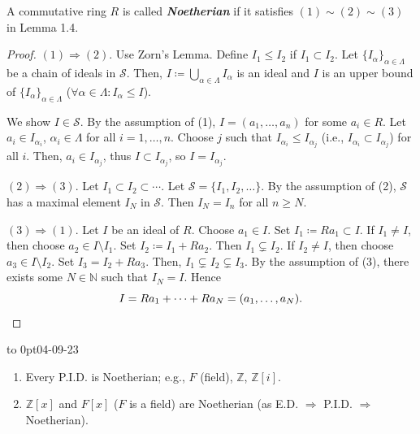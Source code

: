 \documentclass[twoside]{article}
\newcommand\N{\mathbb N}
\newcommand\Z{\mathbb Z}
\theoremstyle{remark}
\newcommand*\term[1]{\textbf{\textit{\mathversion{bold}#1}}}
\newcommand*\newclass[1]{\par\vbox to 0pt{\hbox{\tiny\sffamily\color{gray}#1}} \par\ignorespaces}
\begin{document}
\begin{definition}%
  A commutative ring \(R\) is called \term{Noetherian} if it satisfies \((1) \sim (2) \sim (3)\) in Lemma 1.4.
\end{definition}

\begin{proof}
  \((1) \Rightarrow (2)\). Use Zorn's Lemma. Define \(I_1 \leq I_2\) if \(I_1 \subset I_2\). Let \(\{I_\alpha\}_{\alpha \in \Lambda}\) be a chain of ideals in \(\mathcal S\). Then, \(I \coloneq \bigcup_{\alpha \in \Lambda} I_\alpha\) is an ideal and \(I\) is an upper bound of \(\{I_\alpha\}_{\alpha \in \Lambda}\) (\(\forall \alpha \in \Lambda \colon I_\alpha \leq I\)). \par
  We show \(I \in \mathcal S\). By the assumption of (1), \(I = (a_1, \dots, a_n)\) for some \(a_i \in R\). Let \(a_i \in I_{\alpha_i}\), \(\alpha_i \in \Lambda\) for all \(i = 1, \dots, n\). Choose \(j\) such that \(I_{\alpha_i} \leq I_{\alpha_j}\) (i.e., \(I_{\alpha_i} \subset I_{\alpha_j}\)) for all \(i\). Then, \(a_i \in I_{\alpha_j}\), thus \(I \subset I_{\alpha_j}\), so \(I = I_{\alpha_j}\).
  
  \((2) \Rightarrow (3)\). Let \(I_1 \subset I_2 \subset \cdots\). Let \(\mathcal S = \{I_1, I_2, \dots\}\). By the assumption of (2), \(\mathcal S\) has a maximal element \(I_N\) in \(\mathcal S\). Then \(I_N = I_n\) for all \(n \geq N\).
  
  \((3) \Rightarrow (1)\). Let \(I\) be an ideal of \(R\). Choose \(a_1 \in I\). Set \(I_1 \coloneq Ra_1 \subset I\). If \(I_1 \neq I\), then choose \(a_2 \in I \setminus I_1\). Set \(I_2 \coloneq I_1 + Ra_2\). Then \(I_1 \subsetneq I_2\). If \(I_2 \neq I\), then choose \(a_3 \in I \setminus I_2\). Set \(I_3 = I_2 + Ra_3\). Then, \(I_1 \subsetneq I_2 \subsetneq I_3\). By the assumption of (3), there exists some \(N \in \N\) such that \(I_N = I\). Hence
  \[ I = Ra_1 + \cdots + Ra_N = (a_1, \dots, a_N). \qedhere \]
\end{proof}

\newclass{04-09-23}

\begin{examples}
  \begin{enumerate}[label=\arabic*.]
    \item Every P.I.D. is Noetherian; e.g., \(F\) (field), \(\Z\), \(\Z[i]\).
    \item \(\Z[x]\) and \(F[x]\) (\(F\) is a field) are Noetherian (as E.D. \(\Rightarrow\) P.I.D. \(\Rightarrow\) Noetherian).
  \end{enumerate}
\end{examples}
\end{document}
